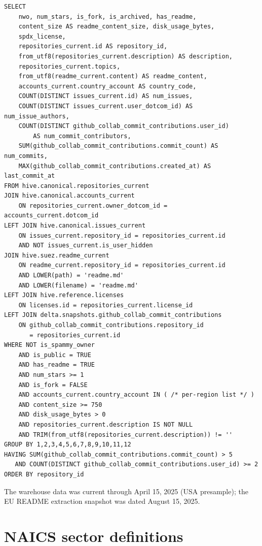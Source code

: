 \documentclass{article}
\begin{document}
{\small
\begin{verbatim}
SELECT
    nwo, num_stars, is_fork, is_archived, has_readme,
    content_size AS readme_content_size, disk_usage_bytes,
    spdx_license,
    repositories_current.id AS repository_id,
    from_utf8(repositories_current.description) AS description,
    repositories_current.topics,
    from_utf8(readme_current.content) AS readme_content,
    accounts_current.country_account AS country_code,
    COUNT(DISTINCT issues_current.id) AS num_issues,
    COUNT(DISTINCT issues_current.user_dotcom_id) AS num_issue_authors,
    COUNT(DISTINCT github_collab_commit_contributions.user_id)
        AS num_commit_contributors,
    SUM(github_collab_commit_contributions.commit_count) AS num_commits,
    MAX(github_collab_commit_contributions.created_at) AS last_commit_at
FROM hive.canonical.repositories_current
JOIN hive.canonical.accounts_current
    ON repositories_current.owner_dotcom_id = accounts_current.dotcom_id
LEFT JOIN hive.canonical.issues_current
    ON issues_current.repository_id = repositories_current.id
    AND NOT issues_current.is_user_hidden
JOIN hive.suez.readme_current
    ON readme_current.repository_id = repositories_current.id
    AND LOWER(path) = 'readme.md'
    AND LOWER(filename) = 'readme.md'
LEFT JOIN hive.reference.licenses
    ON licenses.id = repositories_current.license_id
LEFT JOIN delta.snapshots.github_collab_commit_contributions
    ON github_collab_commit_contributions.repository_id
       = repositories_current.id
WHERE NOT is_spammy_owner
    AND is_public = TRUE
    AND has_readme = TRUE
    AND num_stars >= 1
    AND is_fork = FALSE
    AND accounts_current.country_account IN ( /* per-region list */ )
    AND content_size >= 750
    AND disk_usage_bytes > 0
    AND repositories_current.description IS NOT NULL
    AND TRIM(from_utf8(repositories_current.description)) != ''
GROUP BY 1,2,3,4,5,6,7,8,9,10,11,12
HAVING SUM(github_collab_commit_contributions.commit_count) > 5
   AND COUNT(DISTINCT github_collab_commit_contributions.user_id) >= 2
ORDER BY repository_id
\end{verbatim}
}

The warehouse data was current through April 15, 2025 (USA presample);
the EU README extraction snapshot was dated August 15, 2025.

\section{NAICS sector definitions}
\label{app:naics}
\end{document}
